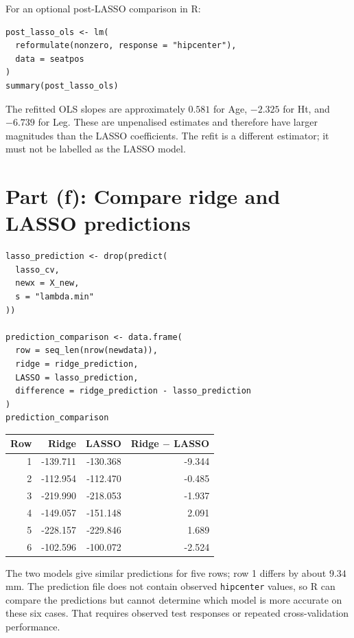 ﻿\documentclass[11pt]{article}
\begin{document}
For an optional post-LASSO comparison in R:

\begin{lstlisting}
post_lasso_ols <- lm(
  reformulate(nonzero, response = "hipcenter"),
  data = seatpos
)
summary(post_lasso_ols)
\end{lstlisting}

The refitted OLS slopes are approximately $0.581$ for Age, $-2.325$ for Ht, and
$-6.739$ for Leg. These are unpenalised estimates and therefore have larger
magnitudes than the LASSO coefficients. The refit is a different estimator; it
must not be labelled as the LASSO model.

\section{Part (f): Compare ridge and LASSO predictions}

\begin{lstlisting}
lasso_prediction <- drop(predict(
  lasso_cv,
  newx = X_new,
  s = "lambda.min"
))

prediction_comparison <- data.frame(
  row = seq_len(nrow(newdata)),
  ridge = ridge_prediction,
  LASSO = lasso_prediction,
  difference = ridge_prediction - lasso_prediction
)
prediction_comparison
\end{lstlisting}

\begin{center}
\begin{tabular}{rrrr}
\toprule
\rowcolor{navy!10}\textbf{Row}&\textbf{Ridge}&\textbf{LASSO}&\textbf{Ridge $-$ LASSO}\\
\midrule
1&-139.711&-130.368&-9.344\\
2&-112.954&-112.470&-0.485\\
3&-219.990&-218.053&-1.937\\
4&-149.057&-151.148& 2.091\\
5&-228.157&-229.846& 1.689\\
6&-102.596&-100.072&-2.524\\
\bottomrule
\end{tabular}
\end{center}

The two models give similar predictions for five rows; row 1 differs by about
$9.34$ mm. The prediction file does not contain observed
\texttt{hipcenter} values, so R can compare the predictions but cannot determine
which model is more accurate on these six cases. That requires observed test
responses or repeated cross-validation performance.
\end{document}
